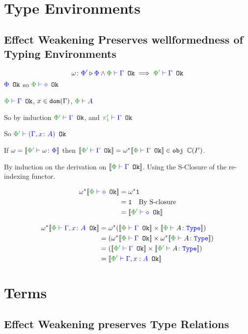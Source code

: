 \documentclass{report}
\begin{document}
\section{Type Environments}
\subsection{Effect Weakening Preserves wellformedness of Typing Environments}
    $$\wrel{\w}{\P'}{\P}\wedge \wellformedok{\P}{\G} \implies \wellformedok{\P'}{\G}$$
    \bi ${\color{blue} \Phi} \texttt{ Ok}$ so $\wellformedok{\P}{\nil}$

    \bi $\wellformedok{\P}{\G}$, $x\in\texttt{dom}(\Gamma)$, $\wellformed{\P}{A}$

    So by induction $\wellformedok{\P'}{\G}$, and $\wellformedok{\p'}{\G}$

    So $\wellformedok{\P'}{(\gax)}$
    
  
If $\w = \deno{\typerelation{\P'}{\w}{\P}}$ then $\deno{\wellformedok{\P'}{\G}} = \w\star\deno{\wellformedok{\P}{\G}}\in\obj\C(I')$.

\proof
By induction on the derivation on $\deno{\wellformedok{\P}{\G}}$. Using the S-Closure of the re-indexing functor.

\begin{align*}
    \w\star\deno{\wellformedok{\P}{\nil}} &=\w\star\1\\
    & = \1\qt{By S-closure}\\
    &= \deno{\wellformedok{\P'}{\nil}}\\
\end{align*}

\begin{align*}
   \w\star\deno{\wellformedok{\P}{\gax}} &= \w\star(\deno{\wellformedok{\P}{\G}} \times \deno{\typerelation{\P}{A}{\type}}) \\
   & = (\w\star\deno{\wellformedok{\P}{\G}} \times \w\star\deno{\typerelation{\P}{A}{\type}})\\
    & = (\deno{\wellformedok{\P'}{\G}} \times \deno{\typerelation{\P'}{A}{\type}})\\
    & = \deno{\wellformedok{\P'}{\G, x: A}}\\
\end{align*}

\section{Terms}


\subsection{Effect Weakening preserves Type Relations}
\end{document}
